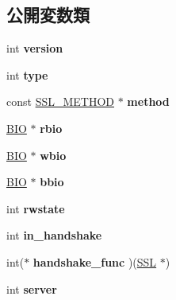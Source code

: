 \subsection*{公開変数類}
\begin{DoxyCompactItemize}
\item 
\hypertarget{structssl__st_a104b2a57e68e7e8c228c34d9ffb0e3dd}{}int {\bfseries version}\label{structssl__st_a104b2a57e68e7e8c228c34d9ffb0e3dd}

\item 
\hypertarget{structssl__st_a5d2a229f22c169bd5eecefd9f017e089}{}int {\bfseries type}\label{structssl__st_a5d2a229f22c169bd5eecefd9f017e089}

\item 
\hypertarget{structssl__st_a10dff58d99726fe56b47ec037c54802e}{}const \hyperlink{structssl__method__st}{S\+S\+L\+\_\+\+M\+E\+T\+H\+O\+D} $\ast$ {\bfseries method}\label{structssl__st_a10dff58d99726fe56b47ec037c54802e}

\item 
\hypertarget{structssl__st_abd180ca9a0f2fb959b07600dcca58118}{}\hyperlink{structbio__st}{B\+I\+O} $\ast$ {\bfseries rbio}\label{structssl__st_abd180ca9a0f2fb959b07600dcca58118}

\item 
\hypertarget{structssl__st_a81a174cdc5f516202537ff6fef6680ed}{}\hyperlink{structbio__st}{B\+I\+O} $\ast$ {\bfseries wbio}\label{structssl__st_a81a174cdc5f516202537ff6fef6680ed}

\item 
\hypertarget{structssl__st_ab0e7dbfa9d11fab6879da0ad8625b65b}{}\hyperlink{structbio__st}{B\+I\+O} $\ast$ {\bfseries bbio}\label{structssl__st_ab0e7dbfa9d11fab6879da0ad8625b65b}

\item 
\hypertarget{structssl__st_a10e8e706cff52214bc873c05786a80ce}{}int {\bfseries rwstate}\label{structssl__st_a10e8e706cff52214bc873c05786a80ce}

\item 
\hypertarget{structssl__st_afc46f99873655d3532930b3f0abb3f98}{}int {\bfseries in\+\_\+handshake}\label{structssl__st_afc46f99873655d3532930b3f0abb3f98}

\item 
\hypertarget{structssl__st_affcb724b5991a587b79a2f91ac7a5a7c}{}int($\ast$ {\bfseries handshake\+\_\+func} )(\hyperlink{structssl__st}{S\+S\+L} $\ast$)\label{structssl__st_affcb724b5991a587b79a2f91ac7a5a7c}

\item 
\hypertarget{structssl__st_a022f1e4cf3a0a68ffc4f4d80d4de8d6b}{}int {\bfseries server}\label{structssl__st_a022f1e4cf3a0a68ffc4f4d80d4de8d6b}


\end{DoxyCompactItemize}
